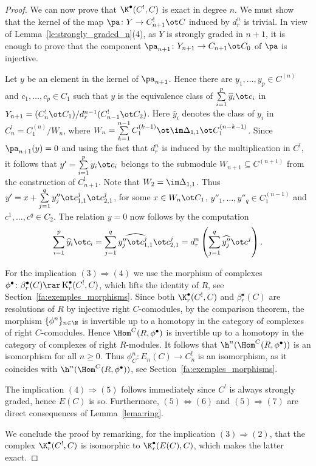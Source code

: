 \begin{proof}
We can now prove that $\K^\bullet(C^!,C)$ is exact in degree $n$. We must show that the kernel of the map $\pa\colon Y\to C^!_{n+1}\ot C$ induced by $d^n_r$ is trivial. In view of Lemma~\ref{le:strongly_graded_n}(4), as $Y$ is strongly graded in $n+1$, it is enough to prove that the component $\pa_{n+1}\colon Y_{n+1}\to C_{n+1}\ot C_0$ of $\pa$ is injective.

Let $y$ be an element in the kernel of $\pa_{n+1}$. Hence there are ${y}_1, \dots,{y}_p\in C^{(n)}$ and $c_1,\dots, c_p\in C_1$ such that $y$ is the equivalence class of $\sum\limits_{i=1}^p \widehat{y}_i\ot c_i$ in $Y_{n+1}=(C_n^!\ot C_1)/d_r^{n-1}(C_{n-1}^!\ot C_2)$. Here $\widehat{y}_i$ denotes the class of $y_i$ in $C^!_n=C_1^{(n)}/W_n$, where $W_n=\sum\limits_{k=1}^{n-1} C_1^{(k-1)}\ot\im\Delta_{1,1}\ot C_1^{(n-k-1)}$. Since $\pa_{n+1}(y)=0$ and using the fact that $d_r^n$ is induced by the multiplication in $C^!$, it follows that $y'=\sum\limits_{i=1}^p {y}_i\ot c_i$ belongs to the submodule $W_{n+1}\subseteq C^{(n+1)}$ from the construction of $C_{n+1}^!$. Note that $W_2=\im\Delta_{1,1}$. Thus $y'=x+\sum\limits_{j=1}^q y_j''\ot c^j_{1,1}\ot c^j_{2,1}$, for some $x\in W_n\ot C_1$, $y''_1,\dots,y''_q\in C_1^{(n-1)}$ and $c^1,\dots,c^q\in C_2$. The relation $y=0$ now follows by the computation
\begin{gather*}
 \sum_{i=1}^p \widehat{y}_i\ot c_i=\sum_{j=1}^q \widehat{y_j''\ot c^j_{1,1}}\ot c^j_{2,1}=d_r^{n}\left(\sum_{j=1}^q {\widehat{y_j''}\ot c^j}\right).
\end{gather*}

For the implication $(3) \Longrightarrow (4)$ we use the morphism of complexes $\phi^\bullet\colon \beta^\bullet_r(C) \rar \operatorname{K}_r^\bullet(C^!,C)$, which lifts the identity of $R$, see Section~\ref{fa:exemples_morphisms}. Since both $\K^{\bullet}_{r}(C^!,C)$ and $\beta{}^{\bullet}_{r}(C)$ are resolutions of $R$ by injective right $C$-comodules, by the comparison theorem, the morphism $\{\phi^n\}_{n\in\N}$ is invertible up to a homotopy in the category of complexes of right $C$-comodules. Hence $\Hom^C(R,\phi^\bullet)$ is invertible up to a homotopy in the category of complexes of right $R$-modules. It follows that $\h^n(\Hom^C(R,\phi^\bullet))$ is an isomorphism for all $n\geq 0$. Thus $\phi^n_C\colon E_n(C)\to C^!_n$ is an isomorphism, as it coincides with $\h^n(\Hom^C(R,\phi^\bullet))$, see Section~\ref{fa:exemples_morphisms}.

The implication $(4) \Longrightarrow (5)$ follows immediately since $C^!$ is always strongly graded, hence $E(C)$ is so. Furthermore, $(5) \iff (6)$ and $(5) \Longrightarrow (7)$ are direct consequences of Lemma~\ref{lema:ring}.

We conclude the proof by remarking, for the implication $(3) \Longrightarrow (2)$, that the complex $\K^\bullet_r(C^!,C)$ is isomorphic to $\K^\bullet_r(E(C),C)$, which makes the latter exact.
\end{proof}
